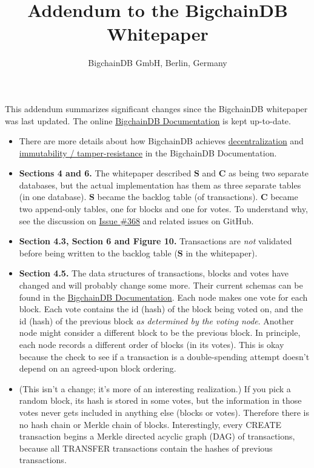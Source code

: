 \documentclass[a4paper]{article}
\title{Addendum to the BigchainDB Whitepaper}
\author{BigchainDB GmbH, Berlin, Germany}
\begin{document}

\maketitle

This addendum summarizes significant changes since the BigchainDB white\-paper was last updated. The online \href{https://docs.bigchaindb.com/}{BigchainDB Documentation} is kept up-to-date.

\begin{itemize}
  \item There are more details about how BigchainDB achieves \href{https://docs.bigchaindb.com/en/latest/decentralized.html}{decentralization} and \href{https://docs.bigchaindb.com/en/latest/immutable.html}{immutability / tamper-resistance} in the BigchainDB Documentation.

  \item \textbf{Sections 4 and 6.} The whitepaper described $\mathbf{S}$ and $\mathbf{C}$ as being two separate databases, but the actual implementation has them as three separate tables (in one database). $\mathbf{S}$ became the backlog table (of transactions). $\mathbf{C}$ became two append-only tables, one for blocks and one for votes. To understand why, see the discussion on \href{https://github.com/bigchaindb/bigchaindb/issues/368}{Issue \#368} and related issues on GitHub.

  \item \textbf{Section 4.3, Section 6 and Figure 10.} Transactions are \emph{not} validated before being written to the backlog table ($\mathbf{S}$ in the whitepaper).

  \item \textbf{Section 4.5.} The data structures of transactions, blocks and votes have changed and will probably change some more. Their current schemas can be found in the \href{https://docs.bigchaindb.com/projects/server/en/latest/index.html}{BigchainDB Documentation}. Each node makes one vote for each block. Each vote contains the id (hash) of the block being voted on, and the id (hash) of the previous block \emph{as determined by the voting node}. Another node might consider a different block to be the previous block. In principle, each node records a different order of blocks (in its votes). This is okay because the check to see if a transaction is a double-spending attempt doesn't depend on an agreed-upon block ordering.

  \item (This isn't a change; it's more of an interesting realization.) If you pick a random block, its hash is stored in some votes, but the information in those votes never gets included in anything else (blocks or votes). Therefore there is no hash chain or Merkle chain of blocks. Interestingly, every CREATE transaction begins a Merkle directed acyclic graph (DAG) of transactions, because all TRANSFER transactions contain the hashes of previous transactions.


\end{itemize}
\end{document}
